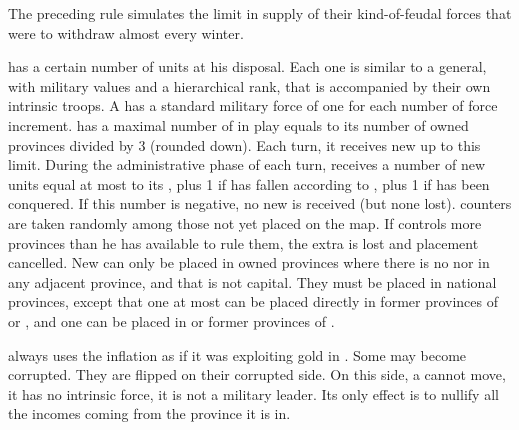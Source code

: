 \begin{designnote}
  The preceding rule simulates the limit in supply of their
  kind-of-feudal forces that were to withdraw almost every winter.
\end{designnote}

\aparag[Pashas]\label{chSpecific:Turkey:Pashas} 
\TUR has a certain number of \Pasha units at his disposal.  
Each one is similar to a general, with
military values and a hierarchical rank, that is accompanied by their
own intrinsic troops. A \Pasha has a standard military force of one
\Timar \LD for each number of force increment.
 \TUR has a maximal number of \Pashas in play
equals to its number of owned provinces divided by 3 (rounded down).
Each turn, it receives new \Pashas up to this limit.
\bparag During the administrative phase of each turn, \TUR receives a
number of new \Pasha units equal at most to its \STAB, plus 1 if
 has fallen according to , plus
1 if  has been conquered. If this number is negative, no
new \Pasha is received (but none lost).
\bparag \Pasha counters are taken randomly among those not yet placed on
the map.
\bparag If \TUR controls more provinces than he has available \Pashas to
rule them, the extra is lost and placement cancelled.
 New \Pashas can only be placed in owned
provinces where there is no \Pasha nor in any adjacent province, and
that is not \TUR capital. They must be placed in \TUR national
provinces, except that one at most can be placed directly in former
provinces of  or , and one can be placed in
 or former provinces of .

\bparag \TUR always uses the inflation as if it was exploiting gold in
.
\bparag Some \Pashas may become corrupted. They are flipped on their
corrupted side. On this side, a \Pasha cannot move, it has no intrinsic
force, it is not a military leader. Its only effect is to nullify all
the incomes coming from the province it is in.

